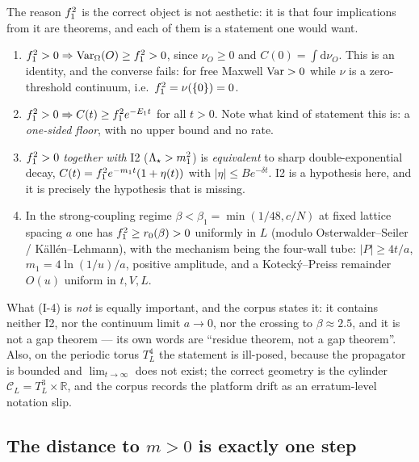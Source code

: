 The reason $f_1^2$ is the correct object is not aesthetic: it is that four implications from it
are theorems, and each of them is a statement one would want. \LT{}
\begin{enumerate}
\item[(I-1)] $f_1^2>0\Rightarrow\operatorname{Var}_\Omega(O)\ge f_1^2>0$, since $\nu_O\ge0$ and
  $C(0)=\int\mathrm{d}\nu_O$. This is an identity, and the converse fails: for free Maxwell
  $\operatorname{Var}>0$ while $\nu$ is a zero-threshold continuum, i.e.\ $f_1^2=\nu(\{0\})=0$.
\item[(I-2)] $f_1^2>0\Rightarrow C(t)\ge f_1^2 e^{-E_1t}$ for all $t>0$. Note what kind of
  statement this is: a \emph{one-sided floor}, with no upper bound and no rate.
\item[(I-3)] $f_1^2>0$ \emph{together with} I2 ($\Lambda_{\star}>m_1^{2}$) is \emph{equivalent} to sharp
  double-exponential decay, $C(t)=f_1^2 e^{-m_1t}(1+\eta(t))$ with $|\eta|\le Be^{-\delta t}$.
  I2 is a hypothesis here, and it is precisely the hypothesis that is missing.
\item[(I-4)] In the strong-coupling regime $\beta<\beta_1=\min(1/48,c/N)$ at fixed lattice spacing
  $a$ one has $f_1^2\ge r_0(\beta)>0$ uniformly in $L$ (modulo Osterwalder--Seiler /
  K\"all\'en--Lehmann), with the mechanism being the four-wall tube: $|P|\ge4t/a$,
  $m_1=4\ln(1/u)/a$, positive amplitude, and a Koteck\'y--Preiss remainder $O(u)$ uniform in
  $t,V,L$.
\end{enumerate}
What (I-4) is \emph{not} is equally important, and the corpus states it: it contains neither I2,
nor the continuum limit $a\to0$, nor the crossing to $\beta\approx2.5$, and it is not a gap
theorem --- its own words are ``residue theorem, not a gap theorem''. Also, on the periodic torus
$T^4_L$ the statement is ill-posed, because the propagator is bounded and $\lim_{t\to\infty}$ does
not exist; the correct geometry is the cylinder $\mathcal{C}_L=T^3_L\times\mathbb{R}$, and the
corpus records the platform drift as an erratum-level notation slip.


\subsection{The distance to $m>0$ is exactly one step}

